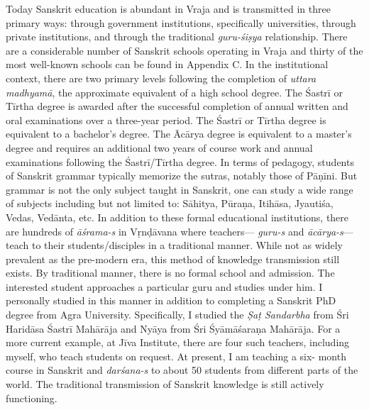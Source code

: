 Today Sanskrit education is abundant in Vraja and is transmitted in three primary ways: through government institutions, specifically universities, through private institutions, and through the traditional {\sl guru-śiṣya} relationship. There are a considerable number of Sanskrit schools operating in Vraja and thirty of the most well-known schools can be found in Appendix C\@. In the institutional context, there are two primary levels following the completion of {\sl uttara madhyamā}, the approximate equivalent of a high school degree. The Śastrī or Tīrtha degree is awarded after the successful completion of annual written and oral examinations over a three-year period. The Śastrī or Tīrtha degree is equivalent to a bachelor’s degree. The Ācārya degree is equivalent to a master’s degree and requires an additional two years of course work and annual examinations following the Śastrī/Tīrtha degree. In terms of pedagogy, students of Sanskrit grammar typically memorize the sutras, notably those of Pāṇīni. But grammar is not the only subject taught in Sanskrit, one can study a wide range of subjects including but not limited to: Sāhitya, Pūraṇa, Itihāsa, Jyautiśa, Vedas, Vedānta, etc. In addition to these formal educational institutions, there are hundreds of {\sl āśrama-s} in Vṛnḍāvana where teachers— {\sl guru-s} and {\sl ācārya-s}— teach to their students/disciples in a traditional manner. While not as widely prevalent as the pre-modern era, this method of knowledge transmission still exists. By traditional manner, there is no formal school and admission. The interested student approaches a particular guru and studies under him. I personally studied in this manner in addition to completing a Sanskrit PhD degree from Agra University. Specifically, I studied the {\sl Ṣaṭ Sandarbha} from Śri Haridāsa Śastrī Mahārāja and Nyāya from Śri Śyāmāśaraṇa Mahārāja. For a more current example, at Jīva Institute, there are four such teachers, including myself, who teach students on request. At present, I am teaching a six- month course in Sanskrit and {\sl darśana-s} to about 50 students from different parts of the world. The traditional transmission of Sanskrit knowledge is still actively functioning. 

